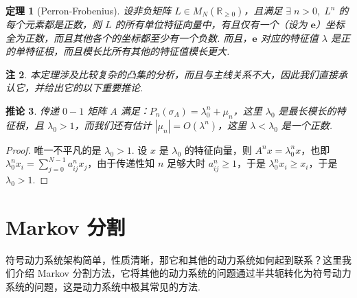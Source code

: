 \documentclass[11pt, a4paper, oneside]{ctexart}
\newtheorem{theorem}{定理}[section]
\newtheorem{corollary}[theorem]{推论}
\newtheorem{remark}[theorem]{注}
\newcommand{\R}{\mathbb{R}}
\newcommand{\abs}[1]{\left|{#1}\right|}
\renewcommand{\v}[1]{\mathbf{#1}}
\begin{document}
    \begin{theorem}[Perron-Frobenius]\label{Thm4.12}
        设非负矩阵 $L\in M_N(\R_{\geq 0})$，且满足 $\exists\; n>0,\; L^n$ 的每个元素都是正数，则 $L$ 的所有单位特征向量中，有且仅有一个（设为 $\v{e}$）坐标全为正数，而且其他各个的坐标都至少有一个负数. 而且，$\v{e}$ 对应的特征值 $\lambda$ 是正的单特征根，而且模长比所有其他的特征值模长更大.
    \end{theorem}
    \begin{remark}
        本定理涉及比较复杂的凸集的分析，而且与主线关系不大，因此我们直接承认它，并给出它的以下重要推论.
    \end{remark}
    \begin{corollary}
        传递 $0-1$ 矩阵 $A$ 满足：$P_n(\sigma_A)=\lambda_0^n+\mu_n$，这里 $\lambda_0$ 是最长模长的特征根，且 $\lambda_0>1$，而我们还有估计 $\abs{\mu_n}=O(\lambda^n)$，这里 $\lambda<\lambda_0$ 是一个正数.
    \end{corollary}
    \begin{proof}
        唯一不平凡的是 $\lambda_0>1$. 设 $x$ 是 $\lambda_0$ 的特征向量，则 $A^n x=\lambda_0^n x$，也即 $\lambda_0^n x_i=\sum\limits_{j=0}^{N-1}a_{ij}^n x_j$，由于传递性知 $n$ 足够大时 $a_{ij}^n\geq 1$，于是 $\lambda_0^n x_i\geq x_i$，于是 $\lambda_0>1$.
    \end{proof}

    \section{Markov 分割}
    符号动力系统架构简单，性质清晰，那它和其他的动力系统如何起到联系？这里我们介绍 Markov 分割方法，它将其他的动力系统的问题通过半共轭转化为符号动力系统的问题，这是动力系统中极其常见的方法.
\end{document}

